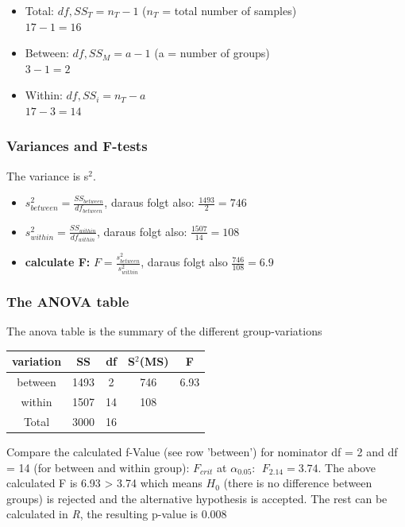 \documentclass{article}
\begin{document}
\begin{itemize}
    \item Total: $df, SS_T = n_T -1$  ($n_T$ = total number of samples) \\
        $17 - 1 = 16$
    \item Between: $df, SS_M = a-1$ (a = number of groups) \\
        $3 - 1 = 2$
    \item Within: $df, SS_i = n_T -a$ \\
        $17 - 3 = 14$
\end{itemize}

\subsubsection{Variances and F-tests}
The variance is s$^2$.
\begin{itemize}
    \item $s^2 _{between} = \frac{SS_{between}}{df_{between}}$, daraus folgt also: $ \frac{1493}{2} = 746$
    \item $s^2 _{within} = \frac{SS_{within}}{df_{within}} $, daraus folgt also: $ \frac{1507}{14} = 108$
    \item \textbf{calculate F: } $F = \frac{s^2 _{between}}{s^2 _{within}}$, daraus folgt also $\frac{746}{108} = 6.9$
\end{itemize}

\subsubsection{The ANOVA table}
The anova table is the summary of the different group-variations
\begin{table}[h]
    \centering
    \begin{tabular}{c|c|c|c|c}
         \textbf{variation} & \textbf{SS} & \textbf{df} &\textbf{S}$^2$(MS) &\textbf{F}  \\
         \hline
         between & 1493 & 2 & 746 & 6.93 \\
         \hline
         within & 1507 & 14 & 108 & \\
         \hline
         Total & 3000 & 16 && 
    \end{tabular}
\end{table}
Compare the calculated f-Value (see row 'between') for nominator df = 2 and df = 14 (for between and within group): $F_{crit} $ at $ \alpha _{0.05} : \:\: F_{2.14} = 3.74$. The above calculated F is 6.93 > 3.74 which means  $H_0$ (there is no difference between groups) is rejected and the alternative hypothesis is accepted. The rest can be calculated in \textit{R}, the resulting p-value is 0.008
\end{document}
